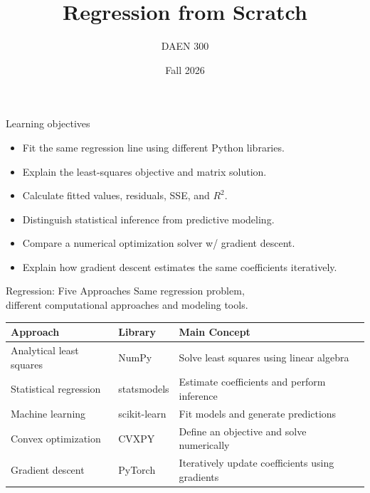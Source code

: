 \documentclass[aspectratio=43,11pt]{beamer}
\title{Regression from Scratch}
\subtitle{}
\author{DAEN 300}
\date{Fall 2026}
\begin{document}
\begin{frame}
\titlepage
\end{frame}

\begin{frame}{Learning objectives}
\begin{itemize}
\item Fit the same regression line using different Python libraries.
\item Explain the least-squares objective and matrix solution.
\item Calculate fitted values, residuals, SSE, and $R^2$.
\item Distinguish statistical inference from predictive modeling.
\item Compare a numerical optimization solver w/ gradient descent.
\item Explain how gradient descent estimates the same coefficients iteratively.
\end{itemize}
\end{frame}

\begin{frame}{Regression: Five Approaches}
\footnotesize
Same regression problem,\\different computational approaches and modeling tools.\\[12pt]
\renewcommand{\arraystretch}{1.2}
\begin{tabular}{@{}
    >{\raggedright\arraybackslash}p{}
    >{\raggedright\arraybackslash}p{}
    >{\raggedright\arraybackslash}p{}
    @{}}
\toprule
\textbf{Approach} &
\textbf{Library} &
\textbf{Main Concept} \\
\midrule
Analytical least squares &
NumPy &
Solve least squares using linear algebra \\
Statistical regression &
statsmodels &
Estimate coefficients and perform inference \\
Machine learning &
scikit-learn &
Fit models and generate predictions \\
Convex optimization &
CVXPY &
Define an objective and solve numerically \\
Gradient descent &
PyTorch &
Iteratively update coefficients using gradients \\
\bottomrule
\end{tabular}
\vfill
\end{frame}
\end{document}
